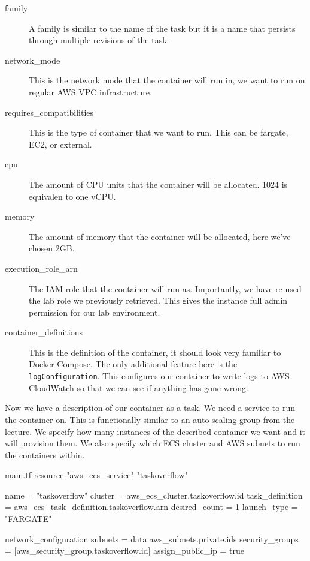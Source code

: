 \documentclass{csse4400}
\begin{document}
\begin{description}
    \item[family] A family is similar to the name of the task but it is a name that persists through multiple revisions of the task.
    \item[network\_mode] This is the network mode that the container will run in, we want to run on regular AWS VPC infrastructure.
    \item[requires\_compatibilities] This is the type of container that we want to run. This can be fargate, EC2, or external.
    \item[cpu] The amount of CPU units that the container will be allocated. 1024 is equivalen to one vCPU.
    \item[memory] The amount of memory that the container will be allocated, here we've chosen 2GB.
    \item[execution\_role\_arn] The IAM role that the container will run as.
        Importantly, we have re-used the lab role we previously retrieved.
        This gives the instance full admin permission for our lab environment.
    \item[container\_definitions] This is the definition of the container, it should look very familiar to Docker Compose.
        The only additional feature here is the \texttt{logConfiguration}.
        This configures our container to write logs to AWS CloudWatch so that we can see if anything has gone wrong.
\end{description}

Now we have a description of our container as a task.
We need a service to run the container on.
This is functionally similar to an auto-scaling group from the lecture.
We specify how many instances of the described container we want and it will provision them.
We also specify which ECS cluster and AWS subnets to run the containers within.

\begin{code}[language=terraform,numbers=none]{main.tf}
resource "aws_ecs_service" "taskoverflow" {
    name            = "taskoverflow"
    cluster         = aws_ecs_cluster.taskoverflow.id
    task_definition = aws_ecs_task_definition.taskoverflow.arn
    desired_count   = 1
    launch_type     = "FARGATE"
  
    network_configuration {
      subnets             = data.aws_subnets.private.ids
      security_groups     = [aws_security_group.taskoverflow.id]
      assign_public_ip    = true
    }
}
\end{code}
\end{document}
